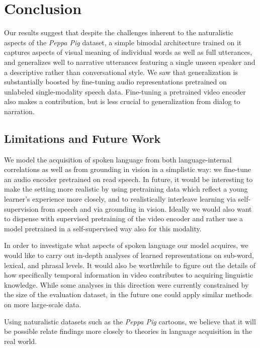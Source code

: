 \section{Conclusion}
\label{sec:conclusion}
Our results suggest that despite the challenges inherent to the
naturalistic aspects of the \emph{Peppa Pig} dataset, a simple bimodal
architecture trained on it captures aspects of visual meaning of individual 
words as well as full utterances, and generalizes well to narrative utterances
featuring a single unseen speaker and a descriptive rather than
conversational style. We saw that generalization is substantially
boosted by fine-tuning audio representations pretrained on unlabeled
single-modality speech data. Fine-tuning a pretrained video encoder
also makes a contribution, but is less crucial to generalization from
dialog to narration.


\subsection{Limitations and Future Work}
\label{sec:limitations}
We model the acquisition of spoken language from both
language-internal correlations as well as from grounding in vision in
a simplistic way: we fine-tune an audio encoder pretrained on read
speech.
In future, it would be interesting to make the setting
more realistic by using pretraining data which reflect a young
learner's experience more closely, and to realistically interleave learning via
self-supervision from speech and via grounding in vision.
Ideally we would also want to dispense with
supervised pretraining of the video encoder and rather use a model pretrained in a
self-supervised way also for this modality.

In order to investigate what aspects of spoken language our model
acquires, we would like to carry out in-depth analyses of learned 
representations on sub-word, lexical, and phrasal levels. It would also be 
worthwhile to figure out the details of how specifically temporal information 
in video contributes to acquiring linguistic knowledge. While some analyses in 
this direction were currently constrained by the size of the evaluation 
dataset, in the future one could apply similar methods on more large-scale data.

Using naturalistic datasets such as the \textit{Peppa Pig} cartoons, we believe
that it will be possible relate findings more closely to theories in 
language acquisition in the real world.


